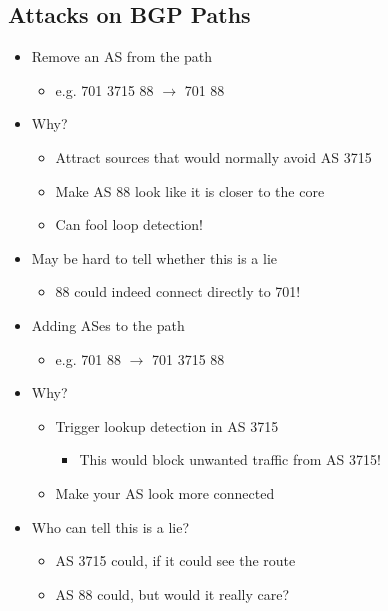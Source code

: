 \subsection{Attacks on BGP Paths}
\begin{itemize}
    \item Remove an AS from the path
          \begin{itemize}
              \item e.g. 701 3715 88 $\to$ 701 88
          \end{itemize}
    \item Why?
          \begin{itemize}
              \item Attract sources that would normally avoid AS 3715
              \item Make AS 88 look like it is closer to the core
              \item Can fool loop detection!
          \end{itemize}
    \item May be hard to tell whether this is a lie
          \begin{itemize}
              \item 88 could indeed connect directly to 701!
          \end{itemize}
\end{itemize}

\begin{itemize}
    \item Adding ASes to the path
          \begin{itemize}
              \item e.g. 701 88 $\to$ 701 3715 88
          \end{itemize}
    \item Why?
          \begin{itemize}
              \item Trigger lookup detection in AS 3715
                    \begin{itemize}
                        \item This would block unwanted traffic from AS 3715!
                    \end{itemize}
              \item Make your AS look more connected
          \end{itemize}
    \item Who can tell this is a lie?
          \begin{itemize}
              \item AS 3715 could, if it could see the route
              \item AS 88 could, but would it really care?
          \end{itemize}
\end{itemize}


